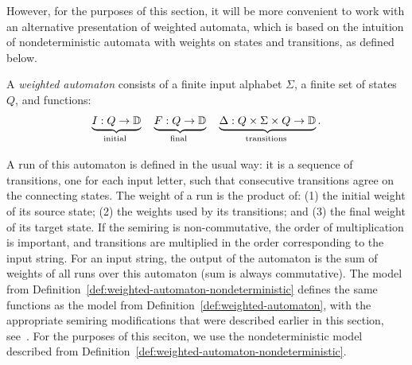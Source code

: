 However, for the purposes of this section, it  will be more convenient to work with an alternative presentation of weighted automata, which is based on the intuition of nondeterministic automata with weights on states and transitions, as defined below. 
\begin{definition}
    \label{def:weighted-automaton-nondeterministic}
    A \emph{weighted automaton} consists of a finite input alphabet $\Sigma$,  a finite set of states $Q$, and functions: 
    \begin{align}
        \label{eq:weight-functions}
    \myunderbrace{I : Q \to \domain}{initial}
    \quad
    \myunderbrace{F : Q \to \domain}{final}
    \quad
    \myunderbrace{\Delta : Q \times \Sigma \times Q \to \domain}{transitions}.
    \end{align}
\end{definition}
 A run of this automaton is defined in the usual way: it is a sequence of transitions, one for each input letter, such that consecutive transitions agree on the connecting states. The weight of a run is the product of: (1) the initial weight of its source state; (2) the weights used by its transitions; and (3) the final weight of its target state. If the semiring is non-commutative, the order of multiplication is  important, and transitions are multiplied in the order corresponding to the input string. For an input string, the output of the automaton is the sum of weights of all runs over this automaton (sum is always commutative).  The model from Definition~\ref{def:weighted-automaton-nondeterministic}  defines the same functions as the model from Definition~\ref{def:weighted-automaton}, with the appropriate semiring modifications that were described earlier in this section, see~\cite[Lemma 8.3]{bojanczyk_automata_2025}. For the purposes of this seciton, we use the nondeterministic  model described from Definition~\ref{def:weighted-automaton-nondeterministic}.



